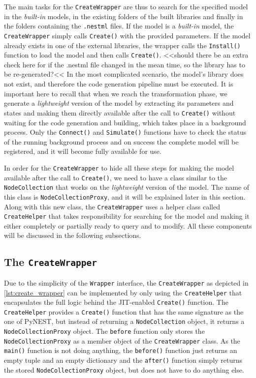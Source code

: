 The main tasks for the \texttt{CreateWrapper} are thus to search for the specified model in the \emph{built-in} models, in the existing folders of the built libraries and finally in the folders containing the \texttt{.nestml} files. If the model is a \emph{built-in} model, the \texttt{CreateWrapper} simply calls \texttt{Create()} with the provided parameters. If the model already exists in one of the external libraries, the wrapper calls the \texttt{Install()} function to load the model and then calls \texttt{Create()}. <<should there be an extra check here for if the .nestml file changed in the mean time, so the library has to be re-generated?<< In the most complicated scenario, the model's library does not exist, and therefore the code generation pipeline must be executed. It is important here to recall that when we reach the transformation phase, we generate a \emph{lightweight} version of the model by extracting its parameters and states and making them directly available after the call to \texttt{Create()} without waiting for the code generation and building, which takes place in a background process. Only the \texttt{Connect()} and \texttt{Simulate()} functions have to check the status of the running background process and on success the complete model will be registered, and it will become fully available for use.

In order for the \texttt{CreateWrapper} to hide all these steps for making the model available after the call to \texttt{Create()}, we need to have a class similar to the \texttt{NodeCollection} that works on the \emph{lightweight} version of the model. The name of this class is \texttt{NodeCollectionProxy}, and it will be explained later in this section. Along with this new class, the \texttt{CreateWrapper} uses a helper class called \texttt{CreateHelper} that takes responsibility for searching for the model and making it either completely or partially ready to query and to modify. All these components will be discussed in the following subsections.

\subsection{The \texttt{CreateWrapper}}

Due to the simplicity of the \texttt{Wrapper} interface, the \texttt{CreateWrapper} as depicted in \autoref{lst:create_wrapper} can be implemented by only using the \texttt{CreateHelper} that encapsulates the full logic behind the JIT-enabled \texttt{Create()} function. The \texttt{CreateHelper} provides a \texttt{Create()} function that has the same signature as the one of PyNEST, but instead of returning a \texttt{NodeCollection} object, it returns a \texttt{NodeCollectionProxy} object. The \texttt{before} function only stores the \texttt{NodeCollectionProxy} as a member object of the \texttt{CreateWrapper} class. As the \texttt{main()} function is not doing anything, the \texttt{before()} function just returns an empty tuple and an empty dictionary and the \texttt{after()} function simply returns the stored \texttt{NodeCollectionProxy} object, but does not have to do anything else.

